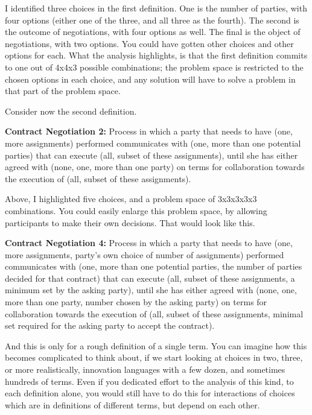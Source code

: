 I identified three choices in the first definition. One is the number of parties, with four options (either one of the three, and all three as the fourth). The second is the outcome of negotiations, with four options as well. The final is the object of negotiations, with two options. You could have gotten other choices and other options for each. What the analysis highlights, is that the first definition commits to one out of 4x4x3 possible combinations; the problem space is restricted to the chosen options in each choice, and any solution will have to solve a problem in that part of the problem space.

Consider now the second definition.

\begin{svgraybox}
\textbf{Contract Negotiation 2:} Process in which a party that needs to have (one, more assignments) performed communicates with (one, more than one potential parties) that can execute (all, subset of these assignments), until she has either agreed with (none, one, more than one party) on terms for collaboration towards the execution of (all, subset of these assignments).
\end{svgraybox}

Above, I highlighted five choices, and a problem space of 3x3x3x3x3 combinations. You could easily enlarge this problem space, by allowing participants to make their own decisions. That would look like this.

\begin{svgraybox}
\textbf{Contract Negotiation 4:} Process in which a party that needs to have (one, more assignments, party's own choice of number of assignments) performed communicates with (one, more than one potential parties, the number of parties decided for that contract) that can execute (all, subset of these assignments, a minimum set by the asking party), until she has either agreed with (none, one, more than one party, number chosen by the asking party) on terms for collaboration towards the execution of (all, subset of these assignments, minimal set required for the asking party to accept the contract).
\end{svgraybox}

And this is only for a rough definition of a single term. You can imagine how this becomes complicated to think about, if we start looking at choices in two, three, or more realistically, innovation languages with a few dozen, and sometimes hundreds of terms. Even if you dedicated effort to the analysis of this kind, to each definition alone, you would still have to do this for interactions of choices which are in definitions of different terms, but depend on each other.

